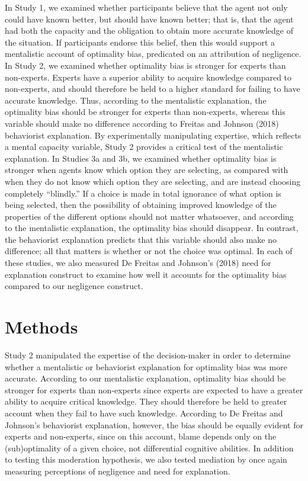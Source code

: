\documentclass[
  man, donotrepeattitle,floatsintext]{apa6}
\begin{document}
In Study 1, we examined whether participants believe that the agent not only could have known better, but should have known better; that is, that the agent had both the capacity and the obligation to obtain more accurate knowledge of the situation. If participants endorse this belief, then this would support a mentalistic account of optimality bias, predicated on an attribution of negligence. In Study 2, we examined whether optimality bias is stronger for experts than non-experts. Experts have a superior ability to acquire knowledge compared to non-experts, and should therefore be held to a higher standard for failing to have accurate knowledge. Thus, according to the mentalistic explanation, the optimality bias should be stronger for experts than non-experts, whereas this variable should make no difference according to Freitas and Johnson (2018) behaviorist explanation. By experimentally manipulating expertise, which reflects a mental capacity variable, Study 2 provides a critical test of the mentalistic explanation. In Studies 3a and 3b, we examined whether optimality bias is stronger when agents know which option they are selecting, as compared with when they do not know which option they are selecting, and are instead choosing completely ``blindly.'' If a choice is made in total ignorance of what option is being selected, then the possibility of obtaining improved knowledge of the properties of the different options should not matter whatsoever, and according to the mentalistic explanation, the optimality bias should disappear. In contrast, the behaviorist explanation predicts that this variable should also make no difference; all that matters is whether or not the choice was optimal. In each of these studies, we also measured De Freitas and Johnson's (2018) need for explanation construct to examine how well it accounts for the optimality bias compared to our negligence construct.

\hypertarget{methods}{%
\section{Methods}\label{methods}}

Study 2 manipulated the expertise of the decision-maker in order to determine whether a mentalistic or behaviorist explanation for optimality bias was more accurate. According to our mentalistic explanation, optimality bias should be stronger for experts than non-experts since experts are expected to have a greater ability to acquire critical knowledge. They should therefore be held to greater account when they fail to have such knowledge. According to De Freitas and Johnson's behaviorist explanation, however, the bias should be equally evident for experts and non-experts, since on this account, blame depends only on the (sub)optimality of a given choice, not differential cognitive abilities. In addition to testing this moderation hypothesis, we also tested mediation by once again measuring perceptions of negligence and need for explanation.
\end{document}
